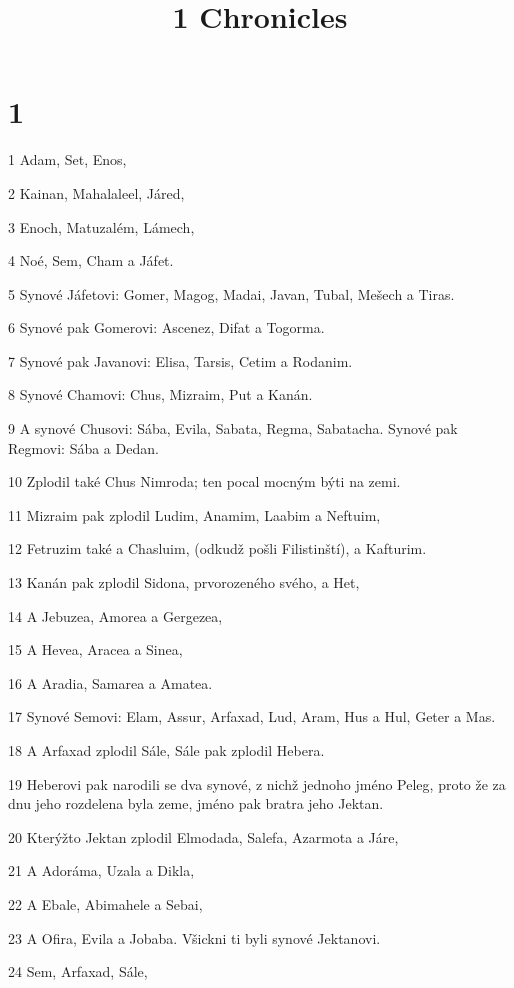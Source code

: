 

\title{1 Chronicles}

\chapter{1}

\par 1 Adam, Set, Enos,
\par 2 Kainan, Mahalaleel, Járed,
\par 3 Enoch, Matuzalém, Lámech,
\par 4 Noé, Sem, Cham a Jáfet.
\par 5 Synové Jáfetovi: Gomer, Magog, Madai, Javan, Tubal, Mešech a Tiras.
\par 6 Synové pak Gomerovi: Ascenez, Difat a Togorma.
\par 7 Synové pak Javanovi: Elisa, Tarsis, Cetim a Rodanim.
\par 8 Synové Chamovi: Chus, Mizraim, Put a Kanán.
\par 9 A synové Chusovi: Sába, Evila, Sabata, Regma, Sabatacha. Synové pak Regmovi: Sába a Dedan.
\par 10 Zplodil také Chus Nimroda; ten pocal mocným býti na zemi.
\par 11 Mizraim pak zplodil Ludim, Anamim, Laabim a Neftuim,
\par 12 Fetruzim také a Chasluim, (odkudž pošli Filistinští), a Kafturim.
\par 13 Kanán pak zplodil Sidona, prvorozeného svého, a Het,
\par 14 A Jebuzea, Amorea a Gergezea,
\par 15 A Hevea, Aracea a Sinea,
\par 16 A Aradia, Samarea a Amatea.
\par 17 Synové Semovi: Elam, Assur, Arfaxad, Lud, Aram, Hus a Hul, Geter a Mas.
\par 18 A Arfaxad zplodil Sále, Sále pak zplodil Hebera.
\par 19 Heberovi pak narodili se dva synové, z nichž jednoho jméno Peleg, proto že za dnu jeho rozdelena byla zeme, jméno pak bratra jeho Jektan.
\par 20 Kterýžto Jektan zplodil Elmodada, Salefa, Azarmota a Járe,
\par 21 A Adoráma, Uzala a Dikla,
\par 22 A Ebale, Abimahele a Sebai,
\par 23 A Ofira, Evila a Jobaba. Všickni ti byli synové Jektanovi.
\par 24 Sem, Arfaxad, Sále,
